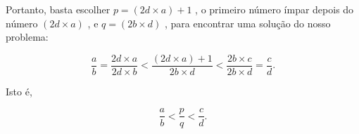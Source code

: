 \documentclass[a4,12pt]{book}
\begin{document}
\begin{refletindo*}[breakable]{}{}
  Portanto, basta escolher   $p = (2d \times a) + 1$  , o primeiro número ímpar depois do número    $(2d \times a)$  ,  e   $q=(2b \times d)$  , para encontrar uma solução do nosso problema:  
  
  $$\dfrac{a}{b} = \dfrac{2d \times a}{2d \times b} < \dfrac{(2d \times a) + 1}{2b \times d} <  \dfrac{2b \times c}{2b \times d} = \dfrac{c}{d}.$$  
  
  Isto é,   
  
  $$\dfrac{a}{b} < \dfrac{p}{q} < \dfrac{c}{d}.$$  
  
\end{refletindo*}
\end{document}

